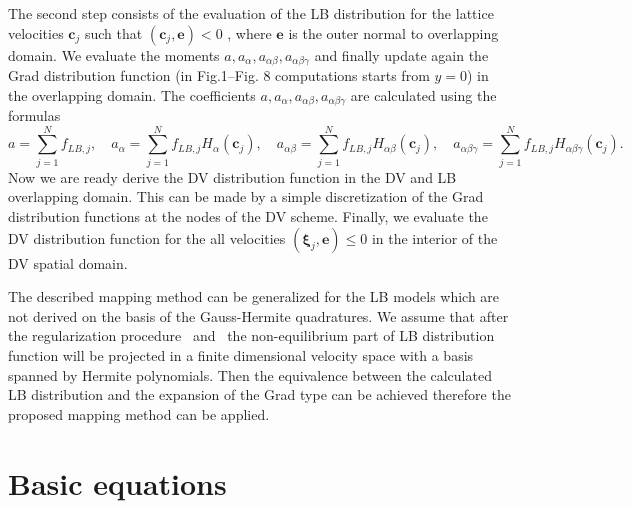\documentclass[]{elsarticle} %
\begin{document}
{The  second  step consists of the evaluation of the LB   distribution  for the lattice velocities  $\boldsymbol{c}_j$ such that $(\boldsymbol{c}_j,\mathbf{e})<0$ , where $\mathbf{e}$ is the outer normal to overlapping domain.  We evaluate the moments $a,a_{\alpha},a_{\alpha\beta},
a_{\alpha\beta\gamma}$ and finally  update again  the  Grad  distribution function (in  Fig.1--Fig. 8 computations starts from $y=0$) in the overlapping domain. The coefficients $a,a_{\alpha},a_{\alpha\beta},
a_{\alpha\beta\gamma}$ are calculated using the formulas
$$
a=\sum_{j=1}^N f_{LB,j}, \quad a_{\alpha}=\sum_{j=1}^N f_{LB,j}H_{\alpha}(\mathbf{c}_j), \quad  a_{\alpha\beta}=\sum_{j=1}^N f_{LB,j}H_{\alpha\beta}(\mathbf{c}_j),
\quad a_{\alpha\beta\gamma}=\sum_{j=1}^N f_{LB,j}H_{\alpha\beta\gamma}(\mathbf{c}_j).
$$
Now  we  are ready derive the DV distribution function in the  DV and  LB  overlapping domain. This  can be made by a simple
discretization of the Grad distribution functions at  the  nodes  of the  DV  scheme. Finally, we evaluate the DV distribution function for  the  all velocities  $(\boldsymbol{\xi}_j,\mathbf{e}) \leq 0$
in the interior of the  DV  spatial domain.

The described mapping  method can be generalized for the LB models which are not derived on the basis of the Gauss-Hermite quadratures. We assume that after the regularization procedure~\cite{Latt2006, Chen2006} and~\cite{Zhang2006, Mont2015, Mattila2017} the non-equilibrium part of LB distribution function will be  projected in a  finite dimensional velocity space with a basis spanned by  Hermite polynomials. Then the equivalence between the calculated LB distribution and
the expansion of the Grad  type can be achieved  therefore  the proposed mapping method can be applied.



\section{Basic equations}\label{sec:equations}

}
\end{document}
